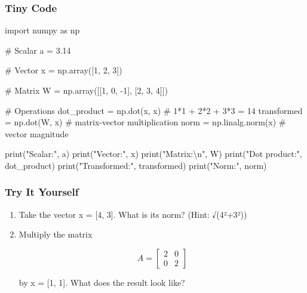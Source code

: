 \documentclass[
  letterpaper,
  DIV=11,
  numbers=noendperiod]{scrreprt}
\newenvironment{Shaded}{\begin{snugshade}}{\end{snugshade}}
\newcommand{\BuiltInTok}[1]{\textcolor[rgb]{0.00,0.23,0.31}{#1}}
\newcommand{\CharTok}[1]{\textcolor[rgb]{0.13,0.47,0.30}{#1}}
\newcommand{\CommentTok}[1]{\textcolor[rgb]{0.37,0.37,0.37}{#1}}
\newcommand{\DecValTok}[1]{\textcolor[rgb]{0.68,0.00,0.00}{#1}}
\newcommand{\FloatTok}[1]{\textcolor[rgb]{0.68,0.00,0.00}{#1}}
\newcommand{\ImportTok}[1]{\textcolor[rgb]{0.00,0.46,0.62}{#1}}
\newcommand{\NormalTok}[1]{\textcolor[rgb]{0.00,0.23,0.31}{#1}}
\newcommand{\OperatorTok}[1]{\textcolor[rgb]{0.37,0.37,0.37}{#1}}
\newcommand{\StringTok}[1]{\textcolor[rgb]{0.13,0.47,0.30}{#1}}
\begin{document}
\subsubsection{Tiny Code}\label{tiny-code-100}

\begin{Shaded}
\begin{Highlighting}[]
\ImportTok{import}\NormalTok{ numpy }\ImportTok{as}\NormalTok{ np}

\CommentTok{\# Scalar}
\NormalTok{a }\OperatorTok{=} \FloatTok{3.14}

\CommentTok{\# Vector}
\NormalTok{x }\OperatorTok{=}\NormalTok{ np.array([}\DecValTok{1}\NormalTok{, }\DecValTok{2}\NormalTok{, }\DecValTok{3}\NormalTok{])}

\CommentTok{\# Matrix}
\NormalTok{W }\OperatorTok{=}\NormalTok{ np.array([[}\DecValTok{1}\NormalTok{, }\DecValTok{0}\NormalTok{, }\OperatorTok{{-}}\DecValTok{1}\NormalTok{],}
\NormalTok{              [}\DecValTok{2}\NormalTok{, }\DecValTok{3}\NormalTok{,  }\DecValTok{4}\NormalTok{]])}

\CommentTok{\# Operations}
\NormalTok{dot\_product }\OperatorTok{=}\NormalTok{ np.dot(x, x)         }\CommentTok{\# 1*1 + 2*2 + 3*3 = 14}
\NormalTok{transformed }\OperatorTok{=}\NormalTok{ np.dot(W, x)         }\CommentTok{\# matrix{-}vector multiplication}
\NormalTok{norm }\OperatorTok{=}\NormalTok{ np.linalg.norm(x)           }\CommentTok{\# vector magnitude}

\BuiltInTok{print}\NormalTok{(}\StringTok{"Scalar:"}\NormalTok{, a)}
\BuiltInTok{print}\NormalTok{(}\StringTok{"Vector:"}\NormalTok{, x)}
\BuiltInTok{print}\NormalTok{(}\StringTok{"Matrix:}\CharTok{\textbackslash{}n}\StringTok{"}\NormalTok{, W)}
\BuiltInTok{print}\NormalTok{(}\StringTok{"Dot product:"}\NormalTok{, dot\_product)}
\BuiltInTok{print}\NormalTok{(}\StringTok{"Transformed:"}\NormalTok{, transformed)}
\BuiltInTok{print}\NormalTok{(}\StringTok{"Norm:"}\NormalTok{, norm)}
\end{Highlighting}
\end{Shaded}

\subsubsection{Try It Yourself}\label{try-it-yourself-100}

\begin{enumerate}
\def\labelenumi{\arabic{enumi}.}
\item
  Take the vector x = {[}4, 3{]}. What is its norm? (Hint: √(4²+3²))
\item
  Multiply the matrix

  \[
  A = \begin{bmatrix}2 & 0 \\ 0 & 2\end{bmatrix}
  \]

  by x = {[}1, 1{]}. What does the result look like?
\end{enumerate}
\end{document}
